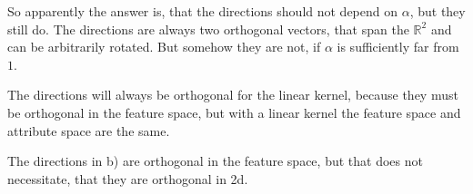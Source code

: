 \documentclass[10pt,a4paper]{article}
\begin{document}
So apparently the answer is, that the directions should not depend on $\alpha$,
but they still do. The directions are always two orthogonal vectors, that span
the $\mathbb{R}^{2}$ and can be arbitrarily rotated. But somehow they are not,
if $\alpha$ is sufficiently far from $1$.

The directions will always be orthogonal for the linear kernel, because they
must be orthogonal in the feature space, but with a linear kernel the feature
space and attribute space are the same.

The directions in b) are orthogonal in the feature space, but that does not
necessitate, that they are orthogonal in 2d.
\end{document}
